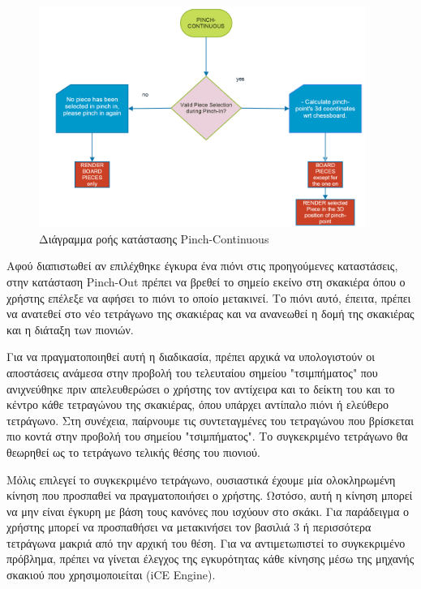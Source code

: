 \begin{figure}[H]
    \centering
    \includegraphics[width=0.95\textwidth]{Files/Figures/pinch_continuous_state.png}
    \caption[Διάγραμμα ροής κατάστασης Pinch-Continuous]{Διάγραμμα ροής κατάστασης Pinch-Continuous}
    \label{fig:pinch-continuous}
\end{figure}



Αφού διαπιστωθεί αν επιλέχθηκε έγκυρα ένα πιόνι στις προηγούμενες καταστάσεις, στην κατάσταση Pinch-Out πρέπει να βρεθεί το σημείο εκείνο στη σκακιέρα όπου ο χρήστης επέλεξε να αφήσει το πιόνι το οποίο μετακινεί. Το πιόνι αυτό, έπειτα, πρέπει να ανατεθεί στο νέο τετράγωνο της σκακιέρας και να ανανεωθεί η δομή της σκακιέρας και η διάταξη των πιονιών.

Για να πραγματοποιηθεί αυτή η διαδικασία, πρέπει αρχικά να υπολογιστούν οι αποστάσεις ανάμεσα στην προβολή του τελευταίου σημείου "τσιμπήματος" που ανιχνεύθηκε πριν απελευθερώσει ο χρήστης τον αντίχειρα και το δείκτη του και το κέντρο κάθε τετραγώνου της σκακιέρας, όπου υπάρχει αντίπαλο πιόνι ή ελεύθερο τετράγωνο. Στη συνέχεια, παίρνουμε τις συντεταγμένες του τετραγώνου που βρίσκεται πιο κοντά στην προβολή του σημείου "τσιμπήματος". Το συγκεκριμένο τετράγωνο θα θεωρηθεί ως το τετράγωνο τελικής θέσης του πιονιού. 


Μόλις επιλεγεί το συγκεκριμένο τετράγωνο, ουσιαστικά έχουμε μία ολοκληρωμένη κίνηση που προσπαθεί να πραγματοποιήσει ο χρήστης. Ωστόσο, αυτή η κίνηση μπορεί να μην είναι έγκυρη με βάση τους κανόνες που ισχύουν στο σκάκι. Για παράδειγμα ο χρήστης μπορεί να προσπαθήσει να μετακινήσει τον βασιλιά 3 ή περισσότερα τετράγωνα μακριά από την αρχική του θέση. Για να αντιμετωπιστεί το συγκεκριμένο πρόβλημα, πρέπει να γίνεται έλεγχος της εγκυρότητας κάθε κίνησης μέσω της μηχανής σκακιού που χρησιμοποιείται (iCE Engine). 


